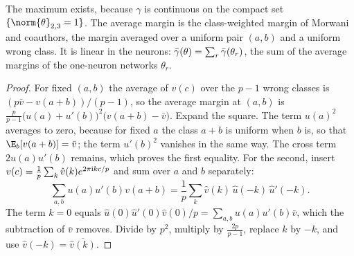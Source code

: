 \begin{refsection}

The maximum exists, because $\gamma$ is continuous on the compact set $\{\norm{\theta}_{2,3}=1\}$. The average margin is the class-weighted margin of Morwani and coauthors, the margin averaged over a uniform pair $(a,b)$ and a uniform wrong class. It is linear in the neurons: $\bar\gamma(\theta)=\sum_r\bar\gamma(\theta_r)$, the sum of the average margins of the one-neuron networks $\theta_r$.


\begin{proof}
For fixed $(a,b)$ the average of $v(c)$ over the $p-1$ wrong classes is $(p\bar v-v(a+b))/(p-1)$, so the average margin at $(a,b)$ is $\frac p{p-1}\bigl(u(a)+u'(b)\bigr)^2\bigl(v(a+b)-\bar v\bigr)$. Expand the square. The term $u(a)^2$ averages to zero, because for fixed $a$ the class $a+b$ is uniform when $b$ is, so that $\E_b[v(a+b)]=\bar v$; the term $u'(b)^2$ vanishes in the same way. The cross term $2u(a)u'(b)$ remains, which proves the first equality. For the second, insert $v(c)=\frac1p\sum_k\hat v(k)e^{2\pi\mathrm{i} kc/p}$ and sum over $a$ and $b$ separately:
\[
  \sum_{a,b}u(a)u'(b)v(a+b)=\frac1p\sum_k\hat v(k)\,\hat u(-k)\,\hat u'(-k).
\]
The term $k=0$ equals $\hat u(0)\hat u'(0)\hat v(0)/p=\sum_{a,b}u(a)u'(b)\bar v$, which the subtraction of $\bar v$ removes. Divide by $p^2$, multiply by $\frac{2p}{p-1}$, replace $k$ by $-k$, and use $\hat v(-k)=\overline{\hat v(k)}$.
\end{proof}


\end{refsection}
